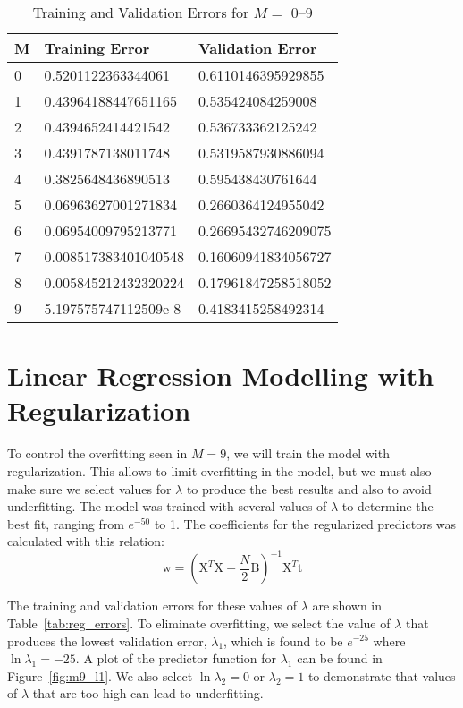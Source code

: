 \documentclass[12pt]{article}
\begin{document}
\begin{table}[htp]
    \centering
    \begin{tabular}{|l|l|l|}
    \hline
    M & Training Error       & Validation Error    \\ \hline
    0 & 0.5201122363344061   & 0.6110146395929855 \\ \hline
    1 & 0.43964188447651165  & 0.535424084259008  \\ \hline
    2 & 0.4394652414421542   & 0.536733362125242  \\ \hline
    3 & 0.4391787138011748   & 0.5319587930886094  \\ \hline
    4 & 0.3825648436890513   & 0.595438430761644 \\ \hline
    5 & 0.06963627001271834  & 0.2660364124955042  \\ \hline
    6 & 0.06954009795213771  & 0.26695432746209075  \\ \hline
    7 & 0.008517383401040548 & 0.16060941834056727  \\ \hline
    8 & 0.005845212432320224 & 0.17961847258518052 \\ \hline
    9 & 5.197575747112509e-8 & 0.4183415258492314   \\ \hline
    \end{tabular}
\caption{Training and Validation Errors for $M =$ 0--9}
\label{tab:errors}
\end{table}
\clearpage

\section*{Linear Regression Modelling with Regularization}
To control the overfitting seen in $M = 9$, we will train the model with regularization. This allows to limit overfitting in the model, but we must also make sure we select values for $\lambda$ to produce the best results and also to avoid underfitting. The model was trained with several values of $\lambda$ to determine the best fit, ranging from $e^{-50}$ to 1. The coefficients for the regularized predictors was calculated with this relation:
\begin{equation}
    \text{w} = (\text{X}^T \text{X} + \frac{N}{2}\text{B})^{-1} \text{X}^T \text{t}
    \label{eq:3}
\end{equation}

The training and validation errors for these values of $\lambda$ are shown in Table~\ref{tab:reg_errors}. To eliminate overfitting, we select the value of $\lambda$ that produces the lowest validation error, $\lambda_1$, which is found to be $e^{-25}$ where $\ln \lambda_1 = -25$. A plot of the predictor function for $\lambda_1$ can be found in Figure~\ref{fig:m9_l1}. We also select $\ln \lambda_2 = 0$ or $\lambda_2 = 1$ to demonstrate that values of $\lambda$ that are too high can lead to underfitting.
\end{document}

